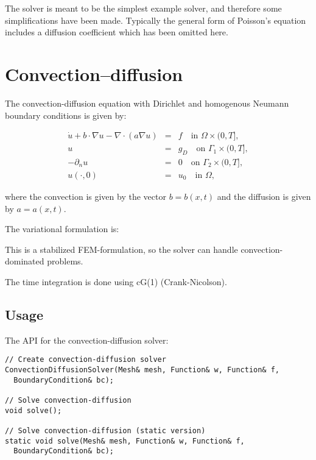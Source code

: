 The solver is meant to be the simplest example solver, and therefore
some simplifications have been made. Typically the general form of
Poisson's equation includes a diffusion coefficient which has been
omitted here.

\section{Convection--diffusion}

The convection-diffusion equation with Dirichlet and homogenous
Neumann boundary conditions is given by:

\begin{equation} \label{eq:convdiff}
  \begin{array}{rcl}
    \dot{u} + b \cdot \nabla u - \nabla \cdot (a \nabla u) &=& f \quad \mbox{in } \Omega \times (0,T], \\
    u &=& g_D \quad \mbox{on } \Gamma_1 \times (0,T], \\
    - \partial_n u &=& 0 \quad \mbox{on } \Gamma_2 \times (0,T], \\
    u(\cdot,0) &=& u_0 \quad \mbox{in } \Omega,
  \end{array}
\end{equation}

where the convection is given by the vector $b = b(x,t)$ and the
diffusion is given by $a = a(x,t)$.

The variational formulation is:


This is a stabilized FEM-formulation, so the solver can handle
convection-dominated problems.

The time integration is done using cG(1) (Crank-Nicolson).

\subsection{Usage}

The API for the convection-diffusion solver:

\begin{verbatim}
// Create convection-diffusion solver
ConvectionDiffusionSolver(Mesh& mesh, Function& w, Function& f,
  BoundaryCondition& bc);
    
// Solve convection-diffusion
void solve();
    
// Solve convection-diffusion (static version)
static void solve(Mesh& mesh, Function& w, Function& f,
  BoundaryCondition& bc);
\end{verbatim}

